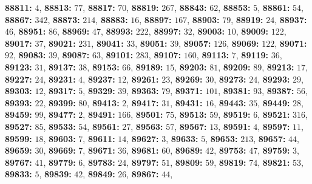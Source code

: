\textsf{\bfseries 88811:} $4$, \textsf{\bfseries 88813:} $77$, \textsf{\bfseries 88817:} $70$, \textsf{\bfseries 88819:} $267$, \textsf{\bfseries 88843:} $62$, \textsf{\bfseries 88853:} $5$, \textsf{\bfseries 88861:} $54$, \textsf{\bfseries 88867:} $342$, \textsf{\bfseries 88873:} $214$, \textsf{\bfseries 88883:} $16$, \textsf{\bfseries 88897:} $167$, \textsf{\bfseries 88903:} $79$, \textsf{\bfseries 88919:} $24$, \textsf{\bfseries 88937:} $46$, \textsf{\bfseries 88951:} $86$, \textsf{\bfseries 88969:} $47$, \textsf{\bfseries 88993:} $222$, \textsf{\bfseries 88997:} $32$, \textsf{\bfseries 89003:} $10$, \textsf{\bfseries 89009:} $122$, \textsf{\bfseries 89017:} $37$, \textsf{\bfseries 89021:} $231$, \textsf{\bfseries 89041:} $33$, \textsf{\bfseries 89051:} $39$, \textsf{\bfseries 89057:} $126$, \textsf{\bfseries 89069:} $122$, \textsf{\bfseries 89071:} $92$, \textsf{\bfseries 89083:} $39$, \textsf{\bfseries 89087:} $63$, \textsf{\bfseries 89101:} $283$, \textsf{\bfseries 89107:} $160$, \textsf{\bfseries 89113:} $7$, \textsf{\bfseries 89119:} $36$, \textsf{\bfseries 89123:} $31$, \textsf{\bfseries 89137:} $38$, \textsf{\bfseries 89153:} $66$, \textsf{\bfseries 89189:} $15$, \textsf{\bfseries 89203:} $81$, \textsf{\bfseries 89209:} $89$, \textsf{\bfseries 89213:} $17$, \textsf{\bfseries 89227:} $24$, \textsf{\bfseries 89231:} $4$, \textsf{\bfseries 89237:} $12$, \textsf{\bfseries 89261:} $23$, \textsf{\bfseries 89269:} $30$, \textsf{\bfseries 89273:} $24$, \textsf{\bfseries 89293:} $29$, \textsf{\bfseries 89303:} $12$, \textsf{\bfseries 89317:} $5$, \textsf{\bfseries 89329:} $39$, \textsf{\bfseries 89363:} $79$, \textsf{\bfseries 89371:} $101$, \textsf{\bfseries 89381:} $93$, \textsf{\bfseries 89387:} $56$, \textsf{\bfseries 89393:} $22$, \textsf{\bfseries 89399:} $80$, \textsf{\bfseries 89413:} $2$, \textsf{\bfseries 89417:} $31$, \textsf{\bfseries 89431:} $16$, \textsf{\bfseries 89443:} $35$, \textsf{\bfseries 89449:} $28$, \textsf{\bfseries 89459:} $99$, \textsf{\bfseries 89477:} $2$, \textsf{\bfseries 89491:} $166$, \textsf{\bfseries 89501:} $75$, \textsf{\bfseries 89513:} $59$, \textsf{\bfseries 89519:} $6$, \textsf{\bfseries 89521:} $316$, \textsf{\bfseries 89527:} $85$, \textsf{\bfseries 89533:} $54$, \textsf{\bfseries 89561:} $27$, \textsf{\bfseries 89563:} $57$, \textsf{\bfseries 89567:} $13$, \textsf{\bfseries 89591:} $4$, \textsf{\bfseries 89597:} $11$, \textsf{\bfseries 89599:} $18$, \textsf{\bfseries 89603:} $7$, \textsf{\bfseries 89611:} $14$, \textsf{\bfseries 89627:} $3$, \textsf{\bfseries 89633:} $5$, \textsf{\bfseries 89653:} $213$, \textsf{\bfseries 89657:} $44$, \textsf{\bfseries 89659:} $30$, \textsf{\bfseries 89669:} $7$, \textsf{\bfseries 89671:} $36$, \textsf{\bfseries 89681:} $60$, \textsf{\bfseries 89689:} $42$, \textsf{\bfseries 89753:} $47$, \textsf{\bfseries 89759:} $3$, \textsf{\bfseries 89767:} $41$, \textsf{\bfseries 89779:} $6$, \textsf{\bfseries 89783:} $24$, \textsf{\bfseries 89797:} $51$, \textsf{\bfseries 89809:} $59$, \textsf{\bfseries 89819:} $74$, \textsf{\bfseries 89821:} $53$, \textsf{\bfseries 89833:} $5$, \textsf{\bfseries 89839:} $42$, \textsf{\bfseries 89849:} $26$, \textsf{\bfseries 89867:} $44$, 
